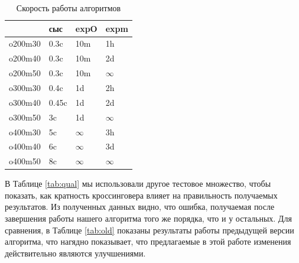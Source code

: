 \documentclass{matmex-diploma-custom}
\begin{document}

\begin{table}[h]
  \centering
\begin{tabular}{llll}
\hline
 & сыс & expO & expm \\
\hline
o200m30 & 0.3c & 10m & 1h \\
o200m40 & 0.3c & 10m & 2d \\
o200m50 & 0.3c & 10m & $\infty$ \\
o300m30 & 0.4c & 1d & 2h \\
o300m40 & 0.45c & 1d & 2d \\
o300m50 & 3c & 1d & $\infty$ \\
o400m30 & 5c & $\infty$ & 3h \\
o400m40 & 6c & $\infty$ & 3d \\
o400m50 & 8c & $\infty$ & $\infty$ \\
\hline
\end{tabular}

  \caption{Скорость работы алгоритмов}
  \label{tab:perf}
\end{table}

В Таблице \ref{tab:qual} мы использовали другое тестовое множество,
чтобы показать, как кратность кроссинговера влияет на правильность
получаемых результатов. Из полученных данных видно, что ошибка,
получаемая после завершения работы нашего алгоритма того же порядка,
что и у остальных. Для сравнения, в Таблице \ref{tab:old} показаны
результаты работы предыдущей версии алгоритма, что нагядно показывает,
что предлагаемые в этой работе изменения действительно являются
улучшениями.

\end{document}
